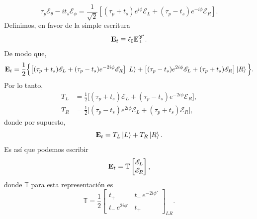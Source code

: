 \begin{equation}
\tau_p\mathscr E_\theta-i t_s\mathscr E_\phi
=
\frac{1}{\sqrt2}
\left[
(\tau_p+t_s)e^{i\phi}\mathscr E_L
+
(\tau_p-t_s)e^{-i\phi}\mathscr E_R
\right].
\end{equation}
Definimos, en favor de la simple escritura
\begin{equation}
  \vb E_t
  \equiv
  \ell_0 \mathbb E^{\mathscr G'}_\perp.
\end{equation}
De modo que,
\begin{equation}
\vb E_t
=
\frac{1}{2}
\Big\{
\big[(\tau_p+t_s)\mathscr E_L+(\tau_p-t_s)e^{-2i\phi}\mathscr E_R\big]\ket L
+
\big[(\tau_p-t_s)e^{2i\phi}\mathscr E_L+(\tau_p+t_s)\mathscr E_R\big]\ket R
\Big\}.
\label{eq:T_perp_circular_basis}
\end{equation}
Por lo tanto,
\begin{equation}
\begin{aligned}
T_L
&=
\frac{1}{2}
\big[
(\tau_p+t_s)\mathscr E_L
+
(\tau_p-t_s)e^{-2i\phi}\mathscr E_R
\big],
\\
T_R
&=
\frac{1}{2}
\big[
(\tau_p-t_s)e^{2i\phi}\mathscr E_L
+
(\tau_p+t_s)\mathscr E_R
\big],
\end{aligned}
\label{eq:TL_TR_circular}
\end{equation}
donde por supuesto,
\begin{equation}
  \vb E_t
  =
  T_L\ket L
  +
  T_R\ket R.
\end{equation}
Es así que podemos escribir
\begin{equation}
  \vb E_t = \mathbb T \begin{bmatrix}
                      \mathscr E_L \\ \mathscr E_R
                    \end{bmatrix},
\end{equation}
donde $\mathbb{T}$ para esta representación es
\begin{equation}
\mathbb T
=
\frac{1}{2}
\begin{bmatrix}
t_+
&
t_-\,e^{-2i\phi'}
\\
t_-\,e^{2i\phi'}
&
t_+
\end{bmatrix}_{LR}.
\label{eq:M_in_circular_basis}
\end{equation}

